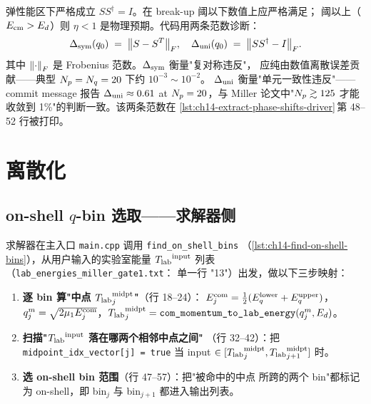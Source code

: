 弹性能区下严格成立 \(SS^\dagger = I\)。在 break-up 阈以下数值上应严格满足；
阈以上（\(E_{\rm cm} > E_d\)）则 \(\eta < 1\) 是物理预期。代码用两条范数诊断：
\begin{equation}
\label{eq:ch14-unitarity-diags}
\Delta_{\rm sym}(q_0) \;=\; \norm{S - S^T}_F,
\quad
\Delta_{\rm uni}(q_0) \;=\; \norm{S S^\dagger - I}_F.
\end{equation}
其中 \(\norm{\cdot}_F\) 是 Frobenius 范数。\(\Delta_{\rm sym}\) 衡量"复对称违反"，
应纯由数值离散误差贡献——典型 \(N_p = N_q = 20\) 下约 \(10^{-3}\sim 10^{-2}\)。
\(\Delta_{\rm uni}\) 衡量"单元一致性违反"——commit message 报告
\(\Delta_{\rm uni} \approx 0.61\) at \(N_p = 20\)，与 Miller 论文中"\(N_p \gtrsim 125\)
才能收敛到 1\%"的判断一致。该两条范数在
\cref{lst:ch14-extract-phase-shifts-driver}\(\,\)第 48--52 行被打印。

\section{离散化}
\label{sec:ch14-discretization}

\subsection{on-shell \(q\)-bin 选取——求解器侧}
\label{subsec:ch14-onshell-q-solver}

求解器在主入口 \texttt{main.cpp} 调用 \texttt{find\_on\_shell\_bins}
（\cref{lst:ch14-find-on-shell-bins}），从用户输入的实验室能量
\({T_{\text{lab}}}^{\rm input}\) 列表（\texttt{lab\_energies\_miller\_gate1.txt}：
单一行 "13"）出发，做以下三步映射：
\begin{enumerate}
  \item \textbf{逐 bin 算"中点 \({T_{\text{lab}}}^{\rm midpt}_j\)"}（行 18--24）：
        \(E_j^{\rm com} = \frac{1}{2}(E_q^{\rm lower} + E_q^{\rm upper})\)，
        \(q_j^m = \sqrt{2\mu_1 E_j^{\rm com}}\)，\({T_{\text{lab}}}^{\rm midpt}_j =
        \texttt{com\_momentum\_to\_lab\_energy}(q_j^m, E_d)\)。
  \item \textbf{扫描"\({T_{\text{lab}}}^{\rm input}\) 落在哪两个相邻中点之间"}
        （行 32--42）：把 \texttt{midpoint\_idx\_vector[j] = true} 当 input
        \(\in [{T_{\text{lab}}}^{\rm midpt}_j, {T_{\text{lab}}}^{\rm midpt}_{j+1}]\) 时。
  \item \textbf{选 on-shell bin 范围}（行 47--57）：把"被命中的中点
        所跨的两个 bin"都标记为 on-shell，即 bin\(_j\) 与 bin\(_{j+1}\)
        都进入输出列表。
\end{enumerate}

